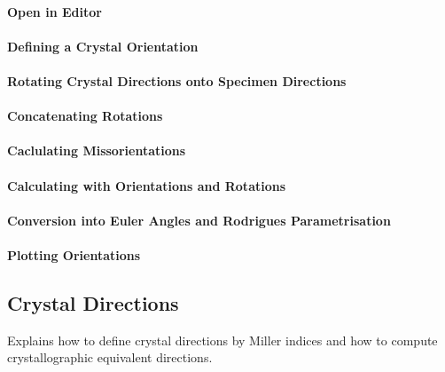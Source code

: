 \documentclass{article}
\begin{document}
                  
			\paragraph{Open in Editor}
		
			\paragraph{Defining a Crystal Orientation}
		
			\paragraph{Rotating Crystal Directions onto Specimen Directions}
		
			\paragraph{Concatenating Rotations}
		
			\paragraph{Caclulating Missorientations}
		
			\paragraph{Calculating with Orientations and Rotations}
		
			\paragraph{Conversion into Euler Angles and Rodrigues Parametrisation}
		
			\paragraph{Plotting Orientations}
		
		\subsection{Crystal Directions}

		
                     \begin{par}
Explains how to define crystal directions by Miller indices and how to compute crystallographic equivalent directions.
\end{par} \vspace{1em}
\end{document}
